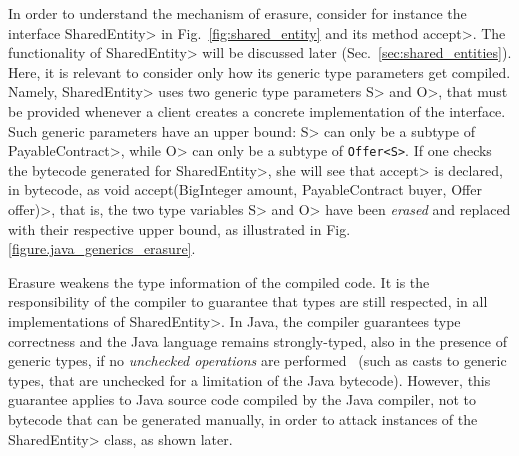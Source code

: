 In order to understand the mechanism of erasure, consider for instance
the interface \<SharedEntity> in Fig.~\ref{fig:shared_entity} and its method \<accept>.
The functionality of \<SharedEntity> will be discussed later (Sec.~\ref{sec:shared_entities}).
Here, it is relevant to consider only how its generic type parameters get compiled.
Namely, \<SharedEntity> uses two generic type parameters \<S> and \<O>, that must be provided
whenever a client creates a concrete implementation of the interface.
Such generic parameters have an upper bound: \<S> can only be a subtype of \<PayableContract>,
while \<O> can only be a subtype of {\codesize\texttt{Offer<S>}}. If one checks the bytecode
generated for \<SharedEntity>, she will see that \<accept> is declared, in bytecode, as
\<void accept(BigInteger amount, PayableContract buyer, Offer offer)>, that is,
the two type variables \<S> and \<O> have been \emph{erased} and replaced with their
respective upper bound, as illustrated in Fig.\,\ref{figure.java_generics_erasure}.



Erasure weakens the type information of the compiled code. It is the responsibility of the
compiler to guarantee that types are still respected, in all implementations of \<SharedEntity>.
In Java, the compiler guarantees type correctness and the Java language remains strongly-typed,
also in the presence of generic types,
if no \emph{unchecked operations} are performed~\cite{NaftalinW06} (such as casts to generic types,
that are unchecked for a limitation of the Java bytecode).
However, this guarantee applies to Java source code compiled by the Java compiler,
not to bytecode that can be generated manually, in order to attack instances of
the \<SharedEntity> class, as shown later.
